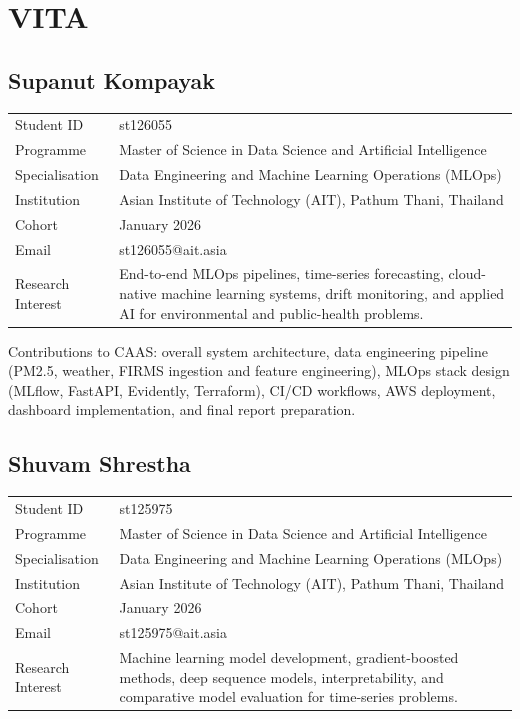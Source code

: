 \chapter*{VITA}

\section*{Supanut Kompayak}

\begin{tabular}{@{}lp{11cm}@{}}
Student ID       & st126055 \\
Programme        & Master of Science in Data Science and Artificial Intelligence \\
Specialisation   & Data Engineering and Machine Learning Operations (MLOps) \\
Institution      & Asian Institute of Technology (AIT), Pathum Thani, Thailand \\
Cohort           & January 2026 \\
Email            & st126055@ait.asia \\
Research Interest & End-to-end MLOps pipelines, time-series forecasting,
                    cloud-native machine learning systems, drift monitoring,
                    and applied AI for environmental and public-health problems. \\
\end{tabular}

\vspace{0.5cm}

\noindent
Contributions to CAAS: overall system architecture, data engineering pipeline
(PM2.5, weather, FIRMS ingestion and feature engineering), MLOps stack design
(MLflow, FastAPI, Evidently, Terraform), CI/CD workflows, AWS deployment,
dashboard implementation, and final report preparation.

\vspace{1cm}

\section*{Shuvam Shrestha}

\begin{tabular}{@{}lp{11cm}@{}}
Student ID       & st125975 \\
Programme        & Master of Science in Data Science and Artificial Intelligence \\
Specialisation   & Data Engineering and Machine Learning Operations (MLOps) \\
Institution      & Asian Institute of Technology (AIT), Pathum Thani, Thailand \\
Cohort           & January 2026 \\
Email            & st125975@ait.asia \\
Research Interest & Machine learning model development, gradient-boosted
                    methods, deep sequence models, interpretability, and
                    comparative model evaluation for time-series problems. \\
\end{tabular}

